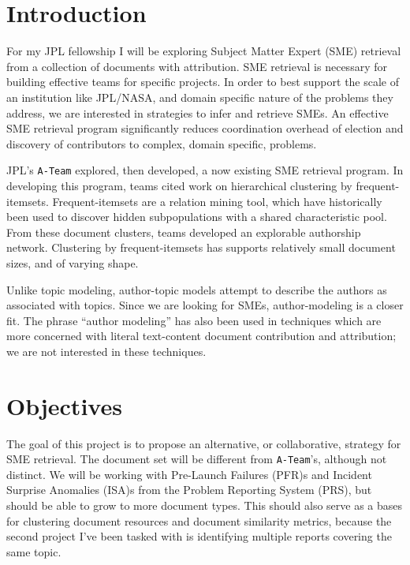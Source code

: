 \documentclass{article}
\begin{document}
\begin{multicols}{2}

\section{Introduction}

For my JPL fellowship I will be exploring Subject Matter Expert (SME) retrieval
from a collection of documents with attribution. SME retrieval is necessary for
building effective teams for specific projects. In order to best support the scale of an
institution like JPL/NASA, and domain specific nature of the problems they address, we are
interested in strategies to infer and retrieve SMEs. An effective SME retrieval program
significantly reduces coordination overhead of election and discovery of
contributors to complex, domain specific, problems.

JPL's \texttt{A-Team} explored, then developed, a now existing SME retrieval program.
In developing this program, teams cited work on hierarchical clustering by
frequent-itemsets\cite{wang2003,kiran2010}. Frequent-itemsets\cite{Agrawal1993} are a
relation mining tool, which have historically been used to discover hidden
subpopulations with a shared characteristic pool. From these document clusters, teams
developed an explorable authorship network. Clustering by frequent-itemsets has
supports relatively small document sizes, and of varying shape.

Unlike topic modeling, author-topic models attempt to describe the authors as
associated with topics. Since we are looking for SMEs,
author-modeling is a closer fit. The phrase ``author modeling'' has also been used
in techniques which are more concerned with literal text-content document
contribution and attribution\cite{Rexha2018}; we are not interested in these techniques.

\section{Objectives}

The goal of this project is to propose an alternative, or collaborative, strategy for
SME retrieval. The document set will be different from \texttt{A-Team}'s, although
not distinct. We will be working with Pre-Launch Failures (PFR)s and
Incident Surprise Anomalies (ISA)s from the Problem Reporting System
(PRS), but should be able to grow to more document types. This should also
serve as a bases for clustering document resources and document similarity metrics,
because the second project I've been tasked with is identifying multiple reports covering
the same topic.


\end{multicols}
\end{document}
